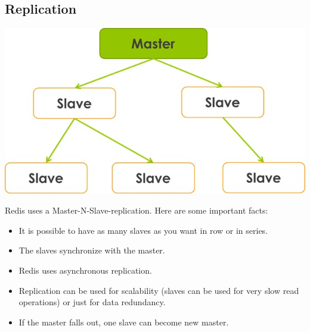 \subsection{Replication}


\includegraphics{images/Redis_Master_N_Slaves_Replikation.jpg}
 \cite{RedisReplicationPicture}

Redis uses a Master-N-Slave-replication. Here are some important facts:

\begin{itemize}
  \item It is possible to have as many slaves as you want in row or in series.
  \item The slaves synchronize with the master.
  \item Redis uses asynchronous replication.
  \item Replication can be used for scalability (slaves can be used for very slow read operations) or just for data redundancy.
  \item If the master falls out, one slave can become new master.

\end{itemize}


 \cite{RedisReplication}


